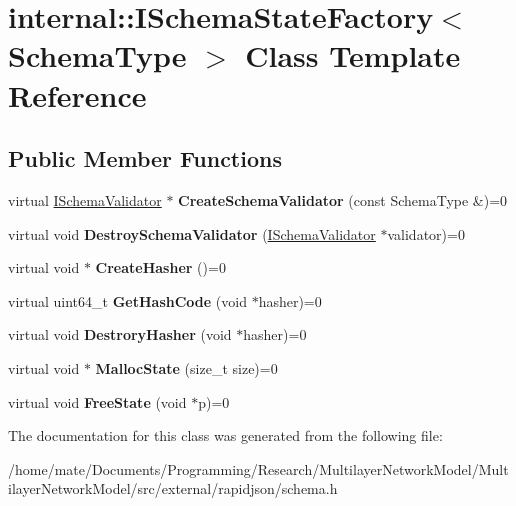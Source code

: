 \hypertarget{classinternal_1_1ISchemaStateFactory}{}\section{internal\+:\+:I\+Schema\+State\+Factory$<$ Schema\+Type $>$ Class Template Reference}
\label{classinternal_1_1ISchemaStateFactory}
\subsection*{Public Member Functions}
\begin{DoxyCompactItemize}
\item 
virtual \hyperlink{classinternal_1_1ISchemaValidator}{I\+Schema\+Validator} $\ast$ {\bfseries Create\+Schema\+Validator} (const Schema\+Type \&)=0\hypertarget{classinternal_1_1ISchemaStateFactory_ae8c98fcff6a057b4fcd9018fc14551a8}{}\label{classinternal_1_1ISchemaStateFactory_ae8c98fcff6a057b4fcd9018fc14551a8}

\item 
virtual void {\bfseries Destroy\+Schema\+Validator} (\hyperlink{classinternal_1_1ISchemaValidator}{I\+Schema\+Validator} $\ast$validator)=0\hypertarget{classinternal_1_1ISchemaStateFactory_a112cbf154077050bc30ffe670032442c}{}\label{classinternal_1_1ISchemaStateFactory_a112cbf154077050bc30ffe670032442c}

\item 
virtual void $\ast$ {\bfseries Create\+Hasher} ()=0\hypertarget{classinternal_1_1ISchemaStateFactory_a4ac37b9d3e9526004c82692473f978f4}{}\label{classinternal_1_1ISchemaStateFactory_a4ac37b9d3e9526004c82692473f978f4}

\item 
virtual uint64\+\_\+t {\bfseries Get\+Hash\+Code} (void $\ast$hasher)=0\hypertarget{classinternal_1_1ISchemaStateFactory_addfcf00963cc777edf642b204f07c8d6}{}\label{classinternal_1_1ISchemaStateFactory_addfcf00963cc777edf642b204f07c8d6}

\item 
virtual void {\bfseries Destrory\+Hasher} (void $\ast$hasher)=0\hypertarget{classinternal_1_1ISchemaStateFactory_a70b8d88180d2e6993105b17f19101635}{}\label{classinternal_1_1ISchemaStateFactory_a70b8d88180d2e6993105b17f19101635}

\item 
virtual void $\ast$ {\bfseries Malloc\+State} (size\+\_\+t size)=0\hypertarget{classinternal_1_1ISchemaStateFactory_ada92ebf8e9ef994f7e20a0f7f9750519}{}\label{classinternal_1_1ISchemaStateFactory_ada92ebf8e9ef994f7e20a0f7f9750519}

\item 
virtual void {\bfseries Free\+State} (void $\ast$p)=0\hypertarget{classinternal_1_1ISchemaStateFactory_a27bd2138940cac3c330dd8399c49b22b}{}\label{classinternal_1_1ISchemaStateFactory_a27bd2138940cac3c330dd8399c49b22b}

\end{DoxyCompactItemize}


The documentation for this class was generated from the following file\+:\begin{DoxyCompactItemize}
\item 
/home/mate/\+Documents/\+Programming/\+Research/\+Multilayer\+Network\+Model/\+Multilayer\+Network\+Model/src/external/rapidjson/schema.\+h\end{DoxyCompactItemize}
